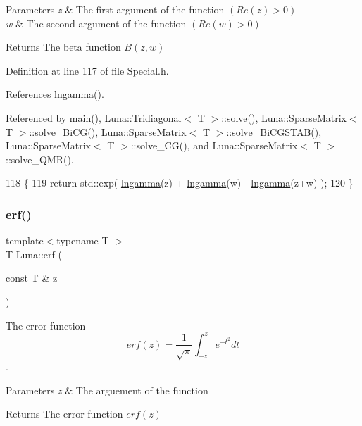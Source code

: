 \begin{DoxyParams}{Parameters}
{\em z} & The first argument of the function $ (Re(z) > 0) $ \\
\hline
{\em w} & The second argument of the function $ (Re(w) > 0) $ \\
\hline
\end{DoxyParams}
\begin{DoxyReturn}{Returns}
The beta function $ B(z,w) $ 
\end{DoxyReturn}


Definition at line 117 of file Special.\+h.



References lngamma().



Referenced by main(), Luna\+::\+Tridiagonal$<$ T $>$\+::solve(), Luna\+::\+Sparse\+Matrix$<$ T $>$\+::solve\+\_\+\+Bi\+C\+G(), Luna\+::\+Sparse\+Matrix$<$ T $>$\+::solve\+\_\+\+Bi\+C\+G\+S\+T\+A\+B(), Luna\+::\+Sparse\+Matrix$<$ T $>$\+::solve\+\_\+\+C\+G(), and Luna\+::\+Sparse\+Matrix$<$ T $>$\+::solve\+\_\+\+Q\+M\+R().


\begin{DoxyCode}
118     \{
119       \textcolor{keywordflow}{return} std::exp( \hyperlink{namespaceLuna_a5682d79a57f8eb7e6c08654af8955d4c}{lngamma}(z) + \hyperlink{namespaceLuna_a5682d79a57f8eb7e6c08654af8955d4c}{lngamma}(w) - \hyperlink{namespaceLuna_a5682d79a57f8eb7e6c08654af8955d4c}{lngamma}(z+w) );
120     \}
\end{DoxyCode}
\mbox{\label{namespaceLuna_a297d1af9ebec3d1b70600f28ff78f137}} 
\subsubsection{\texorpdfstring{erf()}{erf()}}
{\footnotesize\ttfamily template$<$typename T $>$ \\
T Luna\+::erf (\begin{DoxyParamCaption}\item[{const T \&}]{z }\end{DoxyParamCaption})}



The error function \[ erf(z) = \frac{1}{\sqrt{\pi}} \int_{-z}^{z} e^{-t^2} dt \]. 


\begin{DoxyParams}{Parameters}
{\em z} & The arguement of the function \\
\hline
\end{DoxyParams}
\begin{DoxyReturn}{Returns}
The error function $ erf(z) $ 
\end{DoxyReturn}



